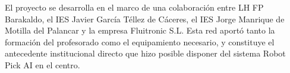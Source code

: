 El proyecto se desarrolla en el marco de una colaboración entre LH FP Barakaldo, el IES Javier García Téllez de Cáceres, el IES Jorge Manrique de Motilla del Palancar y la empresa Fluitronic S.L. Esta red aportó tanto la formación del profesorado como el equipamiento necesario, y constituye el antecedente institucional directo que hizo posible disponer del sistema Robot Pick AI en el centro.
